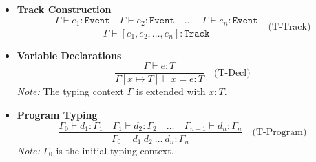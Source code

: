 \documentclass[letterpaper,12pt]{article}
\begin{document}
\begin{itemize}
    \item \textbf{Track Construction}
    \[
    \frac{
        \Gamma \vdash e_1 : \texttt{Event} \quad \Gamma \vdash e_2 : \texttt{Event} \quad \dots \quad \Gamma \vdash e_n : \texttt{Event}
    }{
        \Gamma \vdash [e_1, e_2, \dots, e_n] : \texttt{Track}
    } \quad \text{(T-Track)}
    \]
    
    \item \textbf{Variable Declarations}
    \[
    \frac{
        \Gamma \vdash e : T
    }{
        \Gamma[x \mapsto T] \vdash x = e : T
    } \quad \text{(T-Decl)}
    \]
    \emph{Note:} The typing context \(\Gamma\) is extended with \(x : T\).
    
    \item \textbf{Program Typing}
    \[
    \frac{
        \Gamma_0 \vdash d_1 : \Gamma_1 \quad \Gamma_1 \vdash d_2 : \Gamma_2 \quad \dots \quad \Gamma_{n-1} \vdash d_n : \Gamma_n
    }{
        \Gamma_0 \vdash d_1 \ d_2 \ \dots \ d_n : \Gamma_n
    } \quad \text{(T-Program)}
    \]
    \emph{Note:} \(\Gamma_0\) is the initial typing context.
    

\end{itemize}
\end{document}
